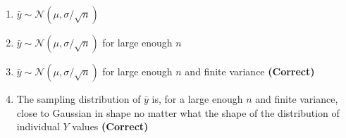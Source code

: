 \documentclass[letterpaper,10pt,twoside,printwatermark=false]{pinp}
\providecommand{\tightlist}{%
  \setlength{\itemsep}{0pt}\setlength{\parskip}{0pt}}
\begin{document}
\begin{enumerate}
\def\labelenumi{\arabic{enumi}.}
\tightlist
\item
  \(\bar{y} \sim \mathcal{N}(\mu, \sigma / \sqrt{n})\)
\item
  \(\bar{y} \sim \mathcal{N}(\mu, \sigma / \sqrt{n})\) for large enough
  \(n\)
\item
  \(\bar{y} \sim \mathcal{N}(\mu, \sigma / \sqrt{n})\) for large enough
  \(n\) and finite variance \textbf{(Correct)}
\item
  The sampling distribution of \(\bar{y}\) is, for a large enough \(n\)
  and finite variance, close to Gaussian in shape no matter what the
  shape of the distribution of individual \(Y\) values
  \textbf{(Correct)}
\end{enumerate}





\end{document}
